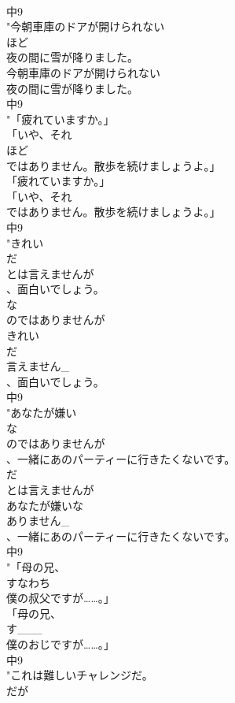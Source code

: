 \documentclass[8pt]{extreport}
\begin{document}
\begin{CJK}{UTF8}{min}
\\	中9
\\	"今朝車庫のドアが開けられない
\\	ほど
\\	夜の間に雪が降りました。
\\	今朝車庫のドアが開けられない
\\	夜の間に雪が降りました。
\\	中9
\\	"「疲れていますか。」
\\	「いや、それ
\\	ほど
\\	ではありません。散歩を続けましょうよ。」
\\	「疲れていますか。」
\\	「いや、それ
\\	ではありません。散歩を続けましょうよ。」
\\	中9
\\	"きれい
\\	だ
\\	とは言えませんが
\\	、面白いでしょう。
\\	な
\\	のではありませんが
\\	きれい
\\	だ
\\	言えません_
\\	、面白いでしょう。
\\	中9
\\	"あなたが嫌い
\\	な
\\	のではありませんが
\\	、一緒にあのパーティーに行きたくないです。
\\	だ
\\	とは言えませんが
\\	あなたが嫌いな
\\	ありません_
\\	、一緒にあのパーティーに行きたくないです。
\\	中9
\\	"「母の兄、
\\	すなわち
\\	僕の叔父ですが……。」
\\	「母の兄、
\\	す___
\\	僕のおじですが……。」
\\	中9
\\	"これは難しいチャレンジだ。
\\	だが

\end{CJK}
\end{document}
